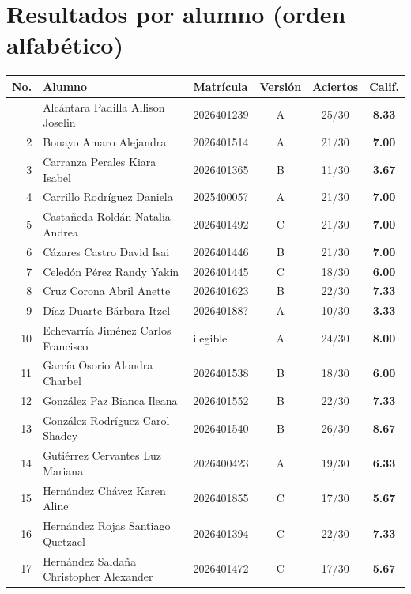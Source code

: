 \documentclass[10pt,letterpaper]{article}
\begin{document}
\section*{Resultados por alumno (orden alfabético)}
{\small\renewcommand{\arraystretch}{1.12}\setlength{\tabcolsep}{4pt}
\begin{longtable}{@{}r >{\raggedright\arraybackslash}p{7.2cm} l c c c@{}}\toprule
\textbf{No.} & \textbf{Alumno} & \textbf{Matrícula} & \textbf{Versión} & \textbf{Aciertos} & \textbf{Calif.}\\\midrule\endhead
\bottomrule\endfoot
1 & Alcántara Padilla Allison Joselin & 2026401239 & A & 25/30 & \textbf{8.33}\\
2 & Bonayo Amaro Alejandra & 2026401514 & A & 21/30 & \textbf{7.00}\\
\rowcolor{rojo!10}3 & Carranza Perales Kiara Isabel & 2026401365 & B & 11/30 & \textbf{3.67}\\
4 & Carrillo Rodríguez Daniela & 202540005? & A & 21/30 & \textbf{7.00}\\
5 & Castañeda Roldán Natalia Andrea & 2026401492 & C & 21/30 & \textbf{7.00}\\
6 & Cázares Castro David Isai & 2026401446 & B & 21/30 & \textbf{7.00}\\
7 & Celedón Pérez Randy Yakin & 2026401445 & C & 18/30 & \textbf{6.00}\\
8 & Cruz Corona Abril Anette & 2026401623 & B & 22/30 & \textbf{7.33}\\
\rowcolor{rojo!10}9 & Díaz Duarte Bárbara Itzel & 202640188? & A & 10/30 & \textbf{3.33}\\
10 & Echevarría Jiménez Carlos Francisco & ilegible & A & 24/30 & \textbf{8.00}\\
11 & García Osorio Alondra Charbel & 2026401538 & B & 18/30 & \textbf{6.00}\\
12 & González Paz Bianca Ileana & 2026401552 & B & 22/30 & \textbf{7.33}\\
13 & González Rodríguez Carol Shadey & 2026401540 & B & 26/30 & \textbf{8.67}\\
14 & Gutiérrez Cervantes Luz Mariana & 2026400423 & A & 19/30 & \textbf{6.33}\\
\rowcolor{rojo!10}15 & Hernández Chávez Karen Aline & 2026401855 & C & 17/30 & \textbf{5.67}\\
16 & Hernández Rojas Santiago Quetzael & 2026401394 & C & 22/30 & \textbf{7.33}\\
\rowcolor{rojo!10}17 & Hernández Saldaña Christopher Alexander & 2026401472 & C & 17/30 & \textbf{5.67}\\

\end{longtable}}
\end{document}
